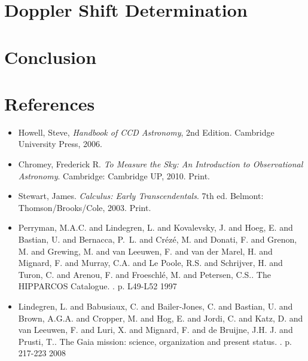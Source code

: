 \documentclass[authoryear, 12pt,5p, times]{elsarticle}
\begin{document}
\section{Doppler Shift Determination}
\section{Conclusion}
 
 \section*{References}
 \begin{footnotesize}
 \begin{itemize}
\item Howell, Steve,  \textit{Handbook of CCD Astronomy}, 2nd Edition. Cambridge University Press, 2006.
\item Chromey, Frederick R. \textit{To Measure the Sky: An Introduction to Observational Astronomy}. Cambridge: Cambridge UP, 2010. Print.
\item Stewart, James. \textit{Calculus: Early Transcendentals}. 7th ed. Belmont: Thomson/Brooks/Cole, 2003. Print.
\item Perryman, M.A.C. and Lindegren, L. and Kovalevsky, J. and Hoeg, E. and Bastian, U. and Bernacca, P.~L. and Cr{\'ez\'e}, M. and Donati, F. and Grenon, M. and Grewing, M. and van Leeuwen, F. and van der Marel, H. and Mignard, F. and Murray, C.A. and Le Poole, R.S. and Schrijver, H. and Turon, C. and Arenou, F. and Froeschl{\'e}, M. and Petersen, C.S.. The HIPPARCOS Catalogue. . p. L49-L52 1997
\item  Lindegren, L. and Babusiaux, C. and Bailer-Jones, C. and Bastian, U. and Brown, A.G.A. and Cropper, M. and Hog, E. and Jordi, C. and Katz, D. and van Leeuwen, F. and Luri, X. and Mignard, F. and de Bruijne, J.H. J. and Prusti, T.. The Gaia mission: science, organization and present status. . p. 217-223 2008
\end{itemize}
% 
%
  \end{footnotesize}
\end{document}
